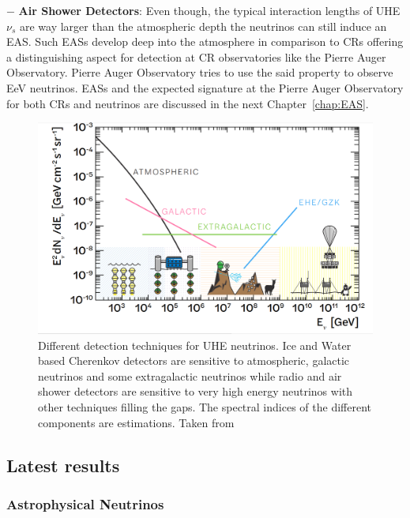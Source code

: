 \begin{description}
  \item $-$ \textbf{Air Shower Detectors}: Even though, the typical interaction lengths of UHE$\nu_s$ are way larger than the atmospheric depth the neutrinos can still induce an EAS. Such EASs develop deep into the atmosphere in comparison to \glspl{CR} offering a distinguishing aspect for detection at \gls{CR} observatories like the Pierre Auger Observatory. Pierre Auger Observatory tries to use the said property to observe EeV neutrinos. EASs and the expected signature at the Pierre Auger Observatory for both \glspl{CR} and neutrinos are discussed in the next Chapter~\ref{chap:EAS}.   

  \end{description}

  \begin{figure}[t!]
    \centering
    \includegraphics[width=14.5cm]{thesis_figures/CRnNu/UHE_nu_techniques.png}
    \caption{Different detection techniques for UHE neutrinos. Ice and Water based Cherenkov detectors are sensitive to atmospheric, galactic neutrinos and some extragalactic neutrinos while radio and air shower detectors are sensitive to very high energy neutrinos with other techniques filling the gaps. The spectral indices of the different components are estimations. Taken from~\cite{Arguelles:2024xkx}}
    \label{fig:UHE-nu-techniques}
  \end{figure}

\subsection{Latest results}
  \label{subsec:Nuresults}
  
\subsubsection*{Astrophysical Neutrinos}


